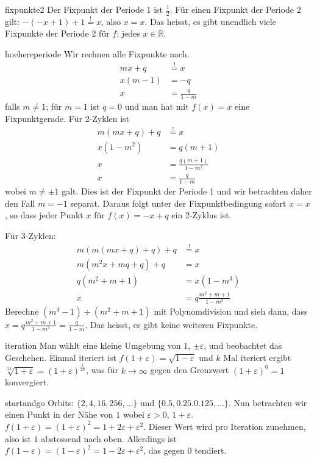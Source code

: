 \documentclass[%
<<<<<<< Updated upstream
<<<<<<< Updated upstream
11pt,%
twoside,%
titlepage,%
german,%
headsepline%
]{scrartcl}
\begin{document}
\begin{lsg}	{fixpunkte2}
Der Fixpunkt der Periode 1 ist $\frac{1}{2}$. Für einen Fixpunkt der Periode 2 gilt: $-(-x+1)+1\stackrel{!}{=}x$, also $x=x$. Das heisst, es gibt unendlich viele Fixpunkte der Periode 2 für $f$; jedes $x\in\mathbb{R}$.
\end{lsg}
\begin{lsg}{hoehereperiode}
Wir rechnen alle Fixpunkte nach.
\begin{align*}
mx+q &\stackrel{!}{=} x\\
x(m-1) &= -q\\
x &= \frac{q}{1-m}
\end{align*}
falls $m\neq1$; für $m=1$ ist $q=0$ und man hat mit $f(x)=x$ eine Fixpunktgerade. Für 2-Zyklen ist
\begin{align*}
m(mx+q)+q &\stackrel{!}{=} x\\
x(1-m^2) &= q(m+1)\\
x &= \frac{q(m+1)}{1-m^2}\\
x &= \frac{q}{1-m}
\end{align*}
wobei $m\neq\pm1$ galt. Dies ist der Fixpunkt der Periode 1 und wir betrachten daher den Fall $m=-1$ separat. Daraus folgt unter der Fixpunktbedingung sofort $x=x$, so dass jeder Punkt $x$ für $f(x)=-x+q$ ein 2-Zyklus ist.

Für 3-Zyklen:
\begin{align*}
m(m(mx+q)+q)+q &\stackrel{!}{=} x\\
m(m^2x+mq+q)+q &= x\\
q(m^2+m+1) &= x(1-m^3)\\
x &= q\frac{m^2+m+1}{1-m^3}
\end{align*}
Berechne $(m^3-1)\div(m^2+m+1)$ mit Polynomdivision und sieh dann, dass $x= q\frac{m^2+m+1}{1-m^3}=\frac{q}{1-m}$. Das heisst, es gibt keine weiteren Fixpunkte.
\end{lsg}
\begin{lsg}{iteration}
Man wählt eine kleine Umgebung von $1$, $\pm\varepsilon$, und beobachtet das Geschehen. Einmal iteriert ist $f(1+\varepsilon)=\sqrt{1-\varepsilon}$ und $k$ Mal iteriert ergibt $\sqrt[2k]{1+\varepsilon}=(1+\varepsilon)^{\frac{1}{2k}}$, was für $k\to\infty$ gegen den Grenzwert $(1+\varepsilon)^{0}=1$ konvergiert.
\end{lsg}
\begin{lsg}{startandgo}
Orbits: $\{2,4,16,256,\dots\}$ und $\{0.5,0.25.0.125,\dots\}$. Nun betrachten wir einen Punkt in der Nähe von $1$ wobei $\varepsilon>0$, $1+\varepsilon$. $f(1+\varepsilon)=(1+\varepsilon)^2=1+2\varepsilon+\varepsilon^2$. Dieser Wert wird pro Iteration zunehmen, also ist $1$ abstossend nach oben. Allerdings ist $f(1-\varepsilon)=(1-\varepsilon)^2=1-2\varepsilon+\varepsilon^2$, das gegen $0$ tendiert.
\end{lsg}
\end{document}
